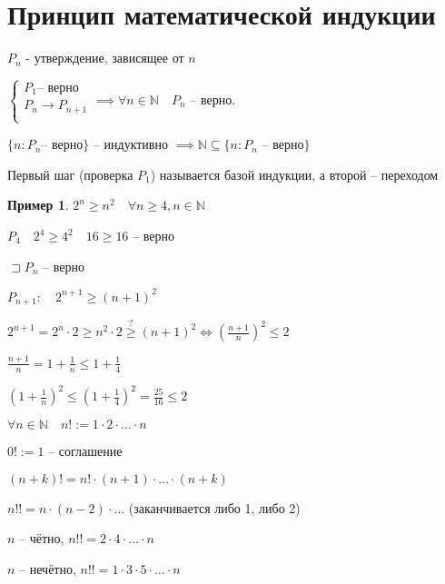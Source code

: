 \documentclass{book}
\newcommand\N{\ensuremath{\mathbb{N}}}
\theoremstyle{definition}
\newtheorem*{example}{Пример}
\begin{document}
    \section{Принцип математической индукции}

    $P_n$ - утверждение, зависящее от $n$

    $\begin{cases}
        P_1 \text{-- верно}\\
        P_n \to P_{n+1}\\
    \end{cases}\implies \forall n\in \N\quad P_n$ -- верно.

    $\{n: P_n \text{-- верно}\}$ -- индуктивно $\implies  \N \subseteq \{n:P_n \text{ -- верно}\}$

    Первый шаг (проверка $P_1$) называется базой индукции, а второй -- переходом

    \begin{example}
        $2^n\geqslant n^2\quad \forall n\geqslant 4, n\in \N $

        $P_4\quad 2^4\geqslant 4^2\quad 16\geqslant 16$ -- верно

        $\sqsupset P_n$ -- верно

        $P_{n+1}:\quad 2^{n+1}\geqslant (n+1)^2$

        $2^{n+1} = 2^n\cdot 2 \geqslant  n^2\cdot 2 \overset{?}{\geqslant} (n+1)^2 \iff \left( \frac{n+1}{n} \right)^2 \leqslant 2  $

        $\frac{n+1}{n} = 1+\frac{1}{n}\leqslant 1+\frac{1}{4}$

        $\left( 1+\frac{1}{n} \right) ^2 \leqslant \left( 1+\frac{1}{4} \right) ^2 = \frac{25}{16}\leqslant 2$
    \end{example}


    \begin{definition}
        $\forall n\in \N \quad n! := 1\cdot 2\cdot \ldots\cdot n$

        $0! := 1$ -- соглашение

        $(n+k)! = n!\cdot (n+1) \cdot  \ldots \cdot  (n+k)$

        $n!! = n\cdot (n-2) \cdot  \ldots$ (заканчивается либо 1, либо 2)

        $n$ -- чётно, $n!! = 2\cdot 4\cdot \ldots\cdot n$

        $n$ -- нечётно, $n!! = 1\cdot 3\cdot 5\cdot \ldots\cdot n$
    \end{definition}
\end{document}
